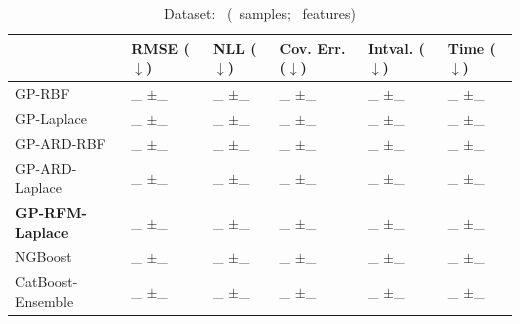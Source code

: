 {\begin{table}[htb]
		\centering
		\caption{Dataset: \lastdataset~(\lastsamples~samples; \lastfeatures~features)}
		\begin{tabular}{l||ll|ll|l}
			\toprule
			& RMSE ($\downarrow$) & NLL ($\downarrow$) & Cov. Err. ($\downarrow$) & Intval. ($\downarrow$) & Time ($\downarrow$) \\
			\midrule
			GP-RBF 			& \lastrmseA_ \scriptsize{$\pm$\lastrmseAstd_} & \lastnllA_ \scriptsize{$\pm$\lastnllAstd_} & \lastcovA_ \scriptsize{$\pm$\lastcovAstd_} & \lastintA_ \scriptsize{$\pm$\lastintAstd_} & \lasttimeA_ \scriptsize{$\pm$\lasttimeAstd_} \\
			GP-Laplace 		& \lastrmseB_ \scriptsize{$\pm$\lastrmseBstd_} & \lastnllB_ \scriptsize{$\pm$\lastnllBstd_} & \lastcovB_ \scriptsize{$\pm$\lastcovBstd_} & \lastintB_ \scriptsize{$\pm$\lastintBstd_} & \lasttimeB_ \scriptsize{$\pm$\lasttimeBstd_} \\
			\midrule
			GP-ARD-RBF 		& \lastrmseC_ \scriptsize{$\pm$\lastrmseCstd_} & \lastnllC_ \scriptsize{$\pm$\lastnllCstd_} & \lastcovC_ \scriptsize{$\pm$\lastcovCstd_} & \lastintC_ \scriptsize{$\pm$\lastintCstd_} & \lasttimeC_ \scriptsize{$\pm$\lasttimeCstd_} \\
			GP-ARD-Laplace 	& \lastrmseD_ \scriptsize{$\pm$\lastrmseDstd_} & \lastnllD_ \scriptsize{$\pm$\lastnllDstd_} & \lastcovD_ \scriptsize{$\pm$\lastcovDstd_} & \lastintD_ \scriptsize{$\pm$\lastintDstd_} & \lasttimeD_ \scriptsize{$\pm$\lasttimeDstd_} \\
			\midrule
			\textbf{GP-RFM-Laplace} 	& \lastrmseE_ \scriptsize{$\pm$\lastrmseEstd_} & \lastnllE_ \scriptsize{$\pm$\lastnllEstd_} & \lastcovE_ \scriptsize{$\pm$\lastcovEstd_} & \lastintE_ \scriptsize{$\pm$\lastintEstd_} & \lasttimeE_ \scriptsize{$\pm$\lasttimeEstd_} \\
			\midrule
			NGBoost 		& \lastrmseF_ \scriptsize{$\pm$\lastrmseFstd_} & \lastnllF_ \scriptsize{$\pm$\lastnllFstd_} & \lastcovF_ \scriptsize{$\pm$\lastcovFstd_} & \lastintF_ \scriptsize{$\pm$\lastintFstd_} & \lasttimeF_ \scriptsize{$\pm$\lasttimeFstd_} \\
			CatBoost-Ensemble 	& \lastrmseG_ \scriptsize{$\pm$\lastrmseGstd_} & \lastnllG_ \scriptsize{$\pm$\lastnllGstd_} & \lastcovG_ \scriptsize{$\pm$\lastcovGstd_} & \lastintG_ \scriptsize{$\pm$\lastintGstd_} & \lasttimeG_ \scriptsize{$\pm$\lasttimeGstd_} \\
			\bottomrule
		\end{tabular}
	\end{table}
}
\clearpage









